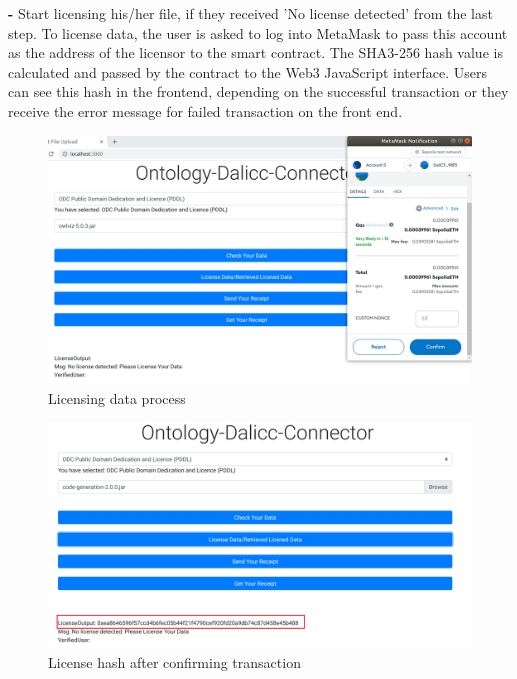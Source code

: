 \begin{itemize}
\begin{center}
\end{center}
   \textbf{- } Start licensing his/her file, if they received 'No license detected' from the last step. To license data, the user is asked to log into MetaMask to pass this account as the address of the licensor to the smart contract. The SHA3-256 hash value is calculated and passed by the contract to the Web3 JavaScript interface. Users can see this hash in the frontend, depending on the successful transaction or they receive the error message for failed transaction on the front end.\\
    \begin{center}
	 \begin{figure}[htb!]
		\begin{minipage}{0.45\linewidth}
			\centering
			\includegraphics[width=1.95\textwidth]{images/chap03_license_data.png}
		\end{minipage}
		\caption[Licensing data process]{Licensing data process}
		
	\end{figure}
\end{center}
   \begin{center}
	\begin{figure}[htb!]
		
		\begin{minipage}{0.45\linewidth}
			\centering
			\includegraphics[width=1.95\textwidth]{images/chap03_license_hash.png}
		\end{minipage}
		\caption[License hash after confirming transaction]{License hash after confirming transaction}
		

\end{figure}
\end{center}
\end{itemize}
